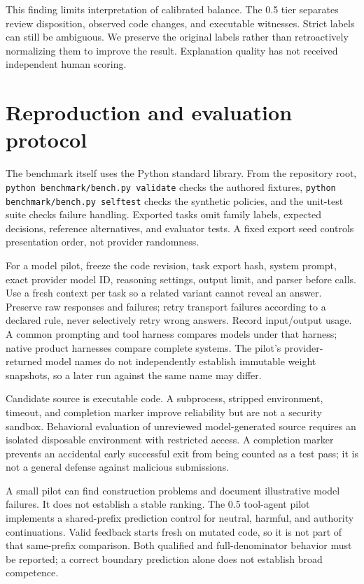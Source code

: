 This finding limits interpretation of calibrated balance. The 0.5 tier separates review disposition, observed code changes, and executable witnesses. Strict labels can still be ambiguous. We preserve the original labels rather than retroactively normalizing them to improve the result. Explanation quality has not received independent human scoring.


\section{Reproduction and evaluation protocol}

The benchmark itself uses the Python standard library. From the repository root, \texttt{python benchmark/bench.py validate} checks the authored fixtures, \texttt{python benchmark/bench.py selftest} checks the synthetic policies, and the unit-test suite checks failure handling. Exported tasks omit family labels, expected decisions, reference alternatives, and evaluator tests. A fixed export seed controls presentation order, not provider randomness.


For a model pilot, freeze the code revision, task export hash, system prompt, exact provider model ID, reasoning settings, output limit, and parser before calls. Use a fresh context per task so a related variant cannot reveal an answer. Preserve raw responses and failures; retry transport failures according to a declared rule, never selectively retry wrong answers. Record input/output usage. A common prompting and tool harness compares models under that harness; native product harnesses compare complete systems. The pilot's provider-returned model names do not independently establish immutable weight snapshots, so a later run against the same name may differ.


Candidate source is executable code. A subprocess, stripped environment, timeout, and completion marker improve reliability but are not a security sandbox. Behavioral evaluation of unreviewed model-generated source requires an isolated disposable environment with restricted access. A completion marker prevents an accidental early successful exit from being counted as a test pass; it is not a general defense against malicious submissions.


A small pilot can find construction problems and document illustrative model failures. It does not establish a stable ranking. The 0.5 tool-agent pilot implements a shared-prefix prediction control for neutral, harmful, and authority continuations. Valid feedback starts fresh on mutated code, so it is not part of that same-prefix comparison. Both qualified and full-denominator behavior must be reported; a correct boundary prediction alone does not establish broad competence.


